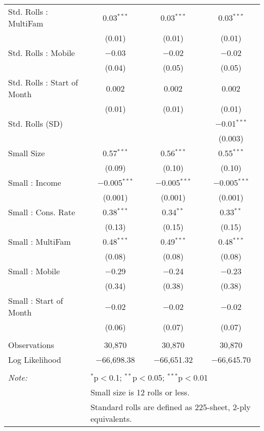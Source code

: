 \begin{table}[!htbp]
\begin{tabular}{@{\extracolsep{5pt}}lccc}
  Std. Rolls : MultiFam & 0.03$^{***}$ & 0.03$^{***}$ & 0.03$^{***}$ \\ 
  & (0.01) & (0.01) & (0.01) \\ 
  Std. Rolls : Mobile & $-$0.03 & $-$0.02 & $-$0.02 \\ 
  & (0.04) & (0.05) & (0.05) \\ 
  Std. Rolls : Start of Month & 0.002 & 0.002 & 0.002 \\ 
  & (0.01) & (0.01) & (0.01) \\ 
  Std. Rolls (SD) &  &  & $-$0.01$^{***}$ \\ 
  &  &  & (0.003) \\ 
  Small Size & 0.57$^{***}$ & 0.56$^{***}$ & 0.55$^{***}$ \\ 
  & (0.09) & (0.10) & (0.10) \\ 
  Small : Income & $-$0.005$^{***}$ & $-$0.005$^{***}$ & $-$0.005$^{***}$ \\ 
  & (0.001) & (0.001) & (0.001) \\ 
  Small : Cons. Rate & 0.38$^{***}$ & 0.34$^{**}$ & 0.33$^{**}$ \\ 
  & (0.13) & (0.15) & (0.15) \\ 
  Small : MultiFam & 0.48$^{***}$ & 0.49$^{***}$ & 0.48$^{***}$ \\ 
  & (0.08) & (0.08) & (0.08) \\ 
  Small : Mobile & $-$0.29 & $-$0.24 & $-$0.23 \\ 
  & (0.34) & (0.38) & (0.38) \\ 
  Small : Start of Month & $-$0.02 & $-$0.02 & $-$0.02 \\ 
  & (0.06) & (0.07) & (0.07) \\ 
 \hline \\[-1.8ex] 
Observations & 30,870 & 30,870 & 30,870 \\ 
Log Likelihood & $-$66,698.38 & $-$66,651.32 & $-$66,645.70 \\ 
\hline 
\hline \\[-1.8ex] 
\textit{Note:}  & \multicolumn{3}{l}{$^{*}$p$<$0.1; $^{**}$p$<$0.05; $^{***}$p$<$0.01} \\ 
 & \multicolumn{3}{l}{Small size is 12 rolls or less.} \\ 
 & \multicolumn{3}{l}{Standard rolls are defined as 225-sheet, 2-ply equivalents.} \\ 
\end{tabular} 
\end{table} 
